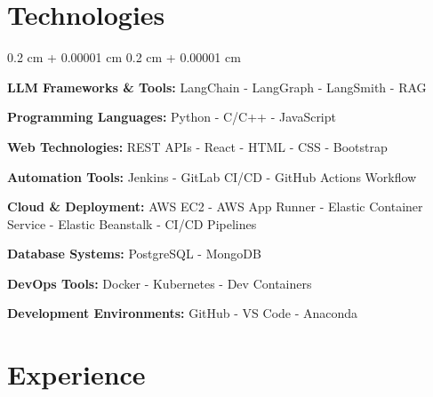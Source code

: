 \documentclass[10pt, letterpaper]{article}
\newenvironment{onecolentry}{
    \begin{adjustwidth}{
        0.2 cm + 0.00001 cm
    }{
        0.2 cm + 0.00001 cm
    }
}{
    \end{adjustwidth}
} %
\let\hrefWithoutArrow\href
\renewcommand{\href}[2]{\hrefWithoutArrow{#1}{\ifthenelse{\equal{#2}{}}{ }{#2 }\raisebox{.15ex}{\footnotesize \faExternalLink*}}}
\begin{document}

\section{Technologies}
\vspace{-0.5cm}
\begin{onecolentry}
\item \textbf{LLM Frameworks \& Tools:} LangChain - LangGraph - LangSmith - RAG
\item \textbf{Programming Languages:} Python - C/C++ - JavaScript
\item \textbf{Web Technologies:} REST APIs - React - HTML - CSS - Bootstrap
\item \textbf{Automation Tools:} Jenkins - GitLab CI/CD - GitHub Actions Workflow
\item \textbf{Cloud \& Deployment:} AWS EC2 - AWS App Runner - Elastic Container Service - Elastic Beanstalk - CI/CD Pipelines
\item \textbf{Database Systems:} PostgreSQL - MongoDB
\item \textbf{DevOps Tools:} Docker - Kubernetes - Dev Containers
\item \textbf{Development Environments:} GitHub - VS Code - Anaconda
\end{onecolentry}

        
\vspace{-0.2 cm}
\section{Experience}
\end{document}
